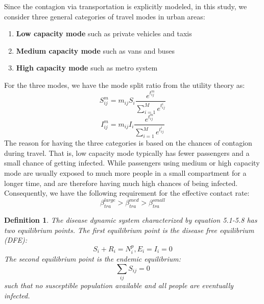 \documentclass[review]{elsarticle}
\theoremstyle{plain}
\newtheorem{defn}{Definition}[section]
\theoremstyle{definition}
\theoremstyle{remark}
\numberwithin{equation}{section}
\theoremstyle{remark}
\begin{document}
Since the contagion via transportation is explicitly modeled, in this study, we consider three general categories of travel modes in urban areas:
\begin{enumerate}
	\item \textbf{Low capacity mode} such as private vehicles and taxis
	\item \textbf{Medium capacity mode} such as vans and buses
	\item \textbf{High capacity mode} such as metro system
\end{enumerate}

For the three modes, we have the mode split ratio from the utility theory as:
\begin{equation}
S_{ij}^m=m_{ij}S_i\frac{e^{t_{ij}^m}}{\sum_{i=1}^M e^{t_{ij}^i}}
\end{equation}
\begin{equation}
I_{ij}^m=m_{ij}I_i\frac{e^{t_{ij}^m}}{\sum_{i=1}^M e^{t_{ij}^i}}
\end{equation}
The reason for having the three categories is based on the chances of contagion during travel. That is, low capacity mode typically has fewer passengers and a small chance of getting infected. While passengers using medium or high capacity mode are usually exposed to much more people in a small compartment for a longer time, and are therefore having much high chances of being infected. Consequently, we have the following requirement for the effective contact rate:
\begin{equation}
\beta_{tra}^{large}>\beta_{tra}^{med}>\beta_{tra}^{small}
\end{equation}
 
 \begin{defn}
 	The disease dynamic system characterized by equation 5.1-5.8 has two equilibrium points. The first equilibrium point is the disease free equilibrium (DFE):
 	\begin{equation}
 	S_i+R_i=N_i^p,E_i=I_i=0
 	\end{equation}
 	The second equilibrium point is the endemic equilibrium:
 	\begin{equation}
 	\sum_{ij} S_{ij}=0
 	\end{equation}
 	such that no susceptible population available and all people are eventually infected. 
 \end{defn}
\end{document}
